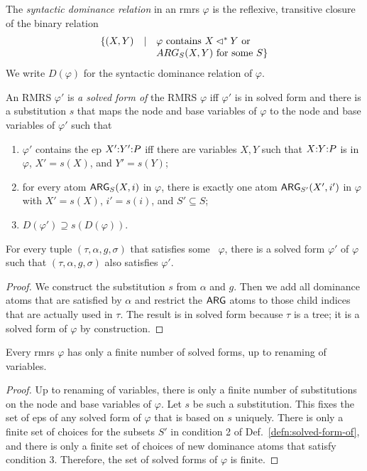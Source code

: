 \begin{definition}  \label{defn:solved-form-of}
  The \emph{syntactic dominance relation} in an {\sc  rmrs} $\varphi$ is the
  reflexive, transitive closure of the binary relation $$
\begin{array}{r c l}
\{(X,Y) & \mid &  \mbox{$\varphi$ contains $X \lhd^* Y$ or}\\
&& \mbox{$ARG_S(X,Y)$ for some
    $S$}\}
\end{array}
$$  
We write $D(\varphi)$ for the syntactic dominance
  relation of $\varphi$.

  An RMRS $\varphi'$ is \emph{a solved form of} the RMRS $\varphi$
  iff $\varphi'$ is in solved form and there is a substitution $s$
  that maps the  node and base variables of $\varphi$ to the node and
  base variables of $\varphi'$ such that
  \begin{enumerate}
  \item $\varphi'$ contains the {\sc ep} $X' {:} Y' {:} P$ iff there are
    variables $X,Y$ such that $X {:} Y {:} P$ is in $\varphi$, $X' =
    s(X)$, and $Y' = s(Y)$;
  \item for every atom $\mathsf{ARG}_S(X,i)$ in $\varphi$, there is exactly
    one atom $\mathsf{ARG}_{S'}(X',i')$ in $\varphi$ with $X' = s(X)$, $i' =
    s(i)$, and $S' \subseteq S$;
  \item $D(\varphi') \supseteq s(D(\varphi))$.
  \end{enumerate}
\end{definition}

\begin{prop} \label{prop:models-satisfy-solved-forms}
  For every tuple $(\tau,\alpha,g,\sigma)$ that satisfies some \rmrs\
  $\varphi$, there is a solved form $\varphi'$ of $\varphi$ such that
  $(\tau,\alpha,g,\sigma)$ also satisfies $\varphi'$.
\end{prop}
\begin{proof}
  We construct the substitution $s$ from $\alpha$ and $g$.  Then we
  add all dominance atoms that are satisfied by $\alpha$ and restrict
  the $\mathsf{ARG}$ atoms to those child indices that are actually used in
  $\tau$.  The result is in solved form because $\tau$ is a tree; it
  is a solved form of $\varphi$ by construction.
\end{proof}

\begin{prop}  \label{prop:finite-solved-forms}
  Every {\sc rmrs} $\varphi$ has only a finite number of solved forms, up to
  renaming of variables.
\end{prop}
\begin{proof}
  Up to renaming of variables, there is only a finite number of
  substitutions on the node and base variables of $\varphi$.  Let $s$
  be such a substitution.  This fixes the set of {\sc ep}s of any
  solved form of $\varphi$ that is based on $s$ uniquely.  There is
  only a finite set of choices for the subsets $S'$ in condition 2 of
  Def.~\ref{defn:solved-form-of}, and there is only a finite set of
  choices of new dominance atoms that satisfy condition 3.  Therefore,
  the set of solved forms of $\varphi$ is finite.
\end{proof}

